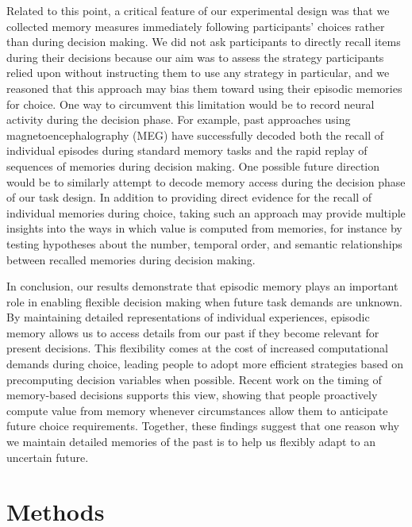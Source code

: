 \documentclass[10pt,letterpaper]{article}
\begin{document}
Related to this point, a critical feature of our experimental design was that we collected memory measures immediately following participants' choices rather than during decision making. We did not ask participants to directly recall items during their decisions because our aim was to assess the strategy participants relied upon without instructing them to use any strategy in particular, and we reasoned that this approach may bias them toward using their episodic memories for choice. One way to circumvent this limitation would be to record neural activity during the decision phase. For example, past approaches using magnetoencephalography (MEG) have successfully decoded both the recall of individual episodes during standard memory tasks\cite{michelmannSpeedTimecompressedForward2019, wimmerEpisodicMemoryRetrieval2020} and the rapid replay of sequences of memories during decision making\cite{liuExperienceReplayAssociated2021, mcfadyenDifferentialReplayReward2023, wimmerDistinctReplaySignatures2023}. One possible future direction would be to similarly attempt to decode memory access during the decision phase of our task design. In addition to providing direct evidence for the recall of individual memories during choice, taking such an approach may provide multiple insights into the ways in which value is computed from memories, for instance by testing hypotheses about the number, temporal order, and semantic relationships between recalled memories during decision making.

In conclusion, our results demonstrate that episodic memory plays an important role in enabling flexible decision making when future task demands are unknown. By maintaining detailed representations of individual experiences, episodic memory allows us to access details from our past if they become relevant for present decisions. This flexibility comes at the cost of increased computational demands during choice, leading people to adopt more efficient strategies based on precomputing decision variables when possible. Recent work on the timing of memory-based decisions supports this view, showing that people proactively compute value from memory whenever circumstances allow them to anticipate future choice requirements\cite{nicholasProactiveReactiveConstruction2025}. Together, these findings suggest that one reason why we maintain detailed memories of the past is to help us flexibly adapt to an uncertain future.

\section{Methods}
\end{document}
